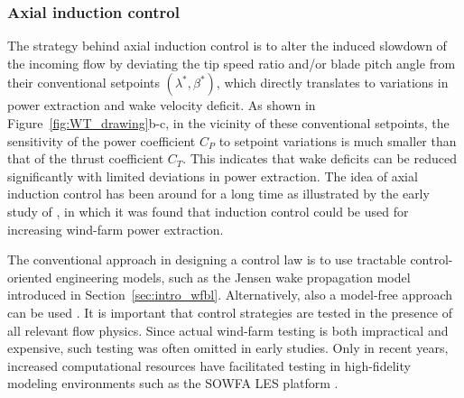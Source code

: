 \subsubsection{Axial induction control}
The strategy behind axial induction control is to alter the induced slowdown of the incoming flow by deviating the tip speed ratio and/or blade pitch angle from their conventional setpoints $(\lambda^*, \beta^*)$, which directly translates to variations in power extraction and wake velocity deficit. As shown in Figure~\ref{fig:WT_drawing}b-c, in the vicinity of these conventional setpoints, the sensitivity of the power coefficient $C_P$ to setpoint variations is much smaller than that of the thrust coefficient $C_T$. This indicates that wake deficits can be reduced significantly with limited deviations in power extraction. The idea of axial induction control has been around for a long time as illustrated by the early study of \cite{steinbuch}, in which it was found that induction control could be used for increasing wind-farm power extraction. 

The conventional approach in designing a control law is to use tractable control-oriented engineering models, such as the Jensen wake propagation model \citep{jensen1983note, katic1986simple} introduced in Section~\ref{sec:intro_wfbl}. Alternatively, also a model-free approach can be used \citep{marden2013model, gebraad2015maximum, ciri2017model}. It is important that control strategies are tested in the presence of all relevant flow physics. Since actual wind-farm testing is both impractical and expensive, such testing was often omitted in early studies. Only in recent years, increased computational resources have facilitated testing in high-fidelity modeling environments such as the SOWFA LES platform \citep{churchfield2012large, fleming2013sowfa}. 

